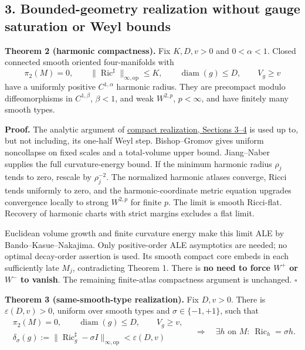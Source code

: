 \documentclass[
  11pt,
]{article}
\begin{document}
\hypertarget{bounded-geometry-realization-without-gauge-saturation-or-weyl-bounds}{%
\subsection{3. Bounded-geometry realization without gauge saturation or
Weyl
bounds}\label{bounded-geometry-realization-without-gauge-saturation-or-weyl-bounds}}

\textbf{Theorem 2 (harmonic compactness).} Fix \(K,D,v>0\) and
\(0<\alpha<1\). Closed connected smooth oriented four-manifolds with \[
 \pi_2(M)=0,\qquad
 \|\operatorname{Ric}^{\sharp}\|_{\infty,\mathrm{op}}\le K,
 \qquad\operatorname{diam}(g)\le D,\qquad V_g\ge v
 \tag{8}
\] have a uniformly positive \(C^{1,\alpha}\) harmonic radius. They are
precompact modulo diffeomorphisms in \(C^{1,\beta}\), \(\beta<1\), and
weak \(W^{2,p}\), \(p<\infty\), and have finitely many smooth types.

\textbf{Proof.} The analytic argument of
\href{20260923_compact_realization.md}{compact realization, Sections
3--4} is used up to, but not including, its one-half Weyl step.
Bishop--Gromov gives uniform noncollapse on fixed scales and a
total-volume upper bound. Jiang--Naber supplies the full
curvature-energy bound. If the minimum harmonic radius \(\rho_j\) tends
to zero, rescale by \(\rho_j^{-2}\). The normalized harmonic atlases
converge, Ricci tends uniformly to zero, and the harmonic-coordinate
metric equation upgrades convergence locally to strong \(W^{2,p}\) for
finite \(p\). The limit is smooth Ricci-flat. Recovery of harmonic
charts with strict margins excludes a flat limit.

Euclidean volume growth and finite curvature energy make this limit ALE
by Bando--Kasue--Nakajima. Only positive-order ALE asymptotics are
needed; no optimal decay-order assertion is used. Its smooth compact
core embeds in each sufficiently late \(M_j\), contradicting Theorem 1.
There is \textbf{no need to force \(W^+\) or \(W^-\) to vanish}. The
remaining finite-atlas compactness argument is unchanged. \(\square\)

\textbf{Theorem 3 (same-smooth-type realization).} Fix \(D,v>0\). There
is \(\varepsilon(D,v)>0\), uniform over smooth types and
\(\sigma\in\{-1,+1\}\), such that \[
 \begin{gathered}
 \pi_2(M)=0,\qquad \operatorname{diam}(g)\le D,\qquad V_g\ge v,\\
 \delta_\sigma(g):=
 \|\operatorname{Ric}^{\sharp}_g-\sigma I\|_{\infty,\mathrm{op}}
          <\varepsilon(D,v)
 \end{gathered}
 \quad\Longrightarrow\quad
 \exists h\text{ on }M:\ \operatorname{Ric}_h=\sigma h.
 \tag{9}
\]
\end{document}
